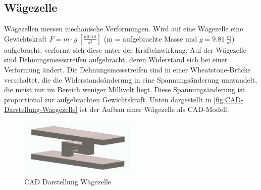 \subsection{Wägezelle}
Wägezellen messen mechanische Verformungen.
Wird auf eine Wägezelle eine Gewichtskraft \mbox{$F = m \cdot g \: \left[ \frac{kg \cdot m}{s^2} \right] $} (m = aufgebrachte Masse und $g = 9.81 \: \frac{m}{s^2}$)  aufgebracht, verformt sich diese unter der Krafteinwirkung.
Auf der Wägezelle sind Dehnungsmessstreifen aufgebracht, deren Widerstand sich bei einer Verformung ändert.
Die Dehnungsmessstreifen sind in einer Wheatstone-Brücke verschaltet, die die Widerstandsänderung in eine Spannungsänderung umwandelt, die meist nur im Bereich weniger Millivolt liegt.
Diese Spannungsänderung ist proportional zur aufgebrachten Gewichtskraft.
Unten dargestellt in \autoref{fig:CAD-Darstellung-Waegezelle} ist der Aufbau einer Wägezelle als CAD-Modell. \\
\begin{figure}[h!]
    \centering
    \includegraphics[width=0.5\textwidth]{img/CAD_Waegezelle.png}
    \caption{CAD Darstellung Wägezelle}
    \label{fig:CAD-Darstellung-Waegezelle}
\end{figure}

